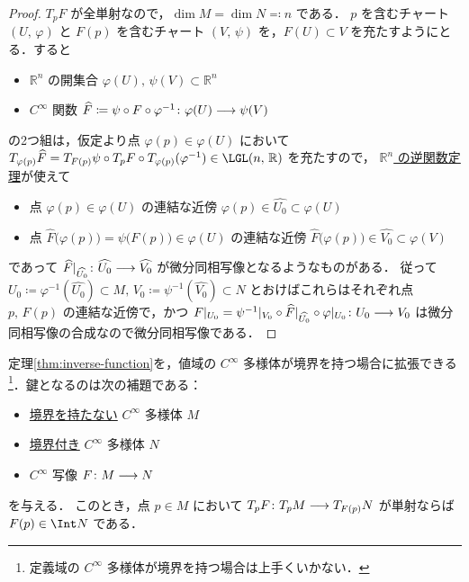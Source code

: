 \documentclass[TQFT_main]{subfiles}
\begin{document}
\begin{proof}
    $T_p F$ が全単射なので，$\dim M = \dim N \eqqcolon n$ である．
    $p$ を含むチャート $(U,\, \varphi)$ と $F(p)$ を含むチャート $(V,\, \psi)$ を，$F(U) \subset V$ を充たすようにとる．すると
    \begin{itemize}
        \item $\mathbb{R}^n$ の開集合 $\varphi(U),\, \psi(V) \subset \mathbb{R}^n$
        \item $C^\infty$ 関数 $\widehat{F} \coloneqq \psi \circ F \circ \varphi^{-1} \colon \varphi(U) \longrightarrow \psi(V)$
    \end{itemize}
    の2つ組は，仮定より点 $\varphi(p) \in \varphi(U)$ において $T_{\varphi(p)} \widehat{F} = T_{F(p)} \psi \circ T_{p} F \circ T_{\varphi(p)} (\varphi^{-1}) \in \LGL(n,\, \mathbb{R})$ を充たすので，
    \hyperref[thm:inverse-function-Rn]{$\mathbb{R}^n$ の逆関数定理}が使えて
    \begin{itemize}
        \item 点 $\varphi(p) \in \varphi(U)$ の連結な近傍 $\varphi(p) \in \widehat{U_0} \subset \varphi(U)$
        \item 点 $\widehat{F}\bigl(\varphi(p)\bigr) = \psi \bigl( F(p) \bigr) \in \varphi(U)$ の連結な近傍 $\widehat{F}\bigl(\varphi(p)\bigr) \in \widehat{V_0} \subset \varphi(V)$
    \end{itemize}
    であって $\widehat{F}|_{\widehat{U_0}} \colon \widehat{U_0} \longrightarrow \widehat{V_0}$ が微分同相写像となるようなものがある．
    従って $U_0 \coloneqq \varphi^{-1} (\widehat{U_0}) \subset M,\, V_0 \coloneqq \psi^{-1}(\widehat{V_0}) \subset N$ とおけばこれらはそれぞれ点 $p,\, F(p)$ の連結な近傍で，かつ $F|_{U_0} = \psi^{-1}|_{V_0} \circ \widehat{F}|_{\widehat{U_0}} \circ \varphi|_{U_0} \colon U_0 \longrightarrow V_0$ は微分同相写像の合成なので微分同相写像である．
\end{proof}

定理\ref{thm:inverse-function}を，値域の $C^\infty$ 多様体が境界を持つ場合に拡張できる\footnote{定義域の $C^\infty$ 多様体が境界を持つ場合は上手くいかない．}．鍵となるのは次の補題である：

\begin{mylem}[label=lem:singular-b]{}
    \begin{itemize}
        \item \underline{境界を持たない} $C^\infty$ 多様体 $M$
        \item \underline{境界付き} $C^\infty$ 多様体 $N$
        \item $C^\infty$ 写像 $F \colon M \longrightarrow N$
    \end{itemize}
    を与える．
    このとき，点 $p \in M$ において $T_p F \colon T_p M \longrightarrow T_{F(p)} N$ が単射ならば $F(p) \in \Int N$ である．
\end{mylem}
\end{document}

